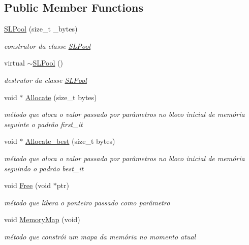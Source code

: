 \subsection*{Public Member Functions}
\begin{DoxyCompactItemize}
\item 
\hyperlink{class_s_l_pool_aea29c4db7975b53f06c4fad1b5901cec}{S\+L\+Pool} (size\+\_\+t \+\_\+bytes)
\begin{DoxyCompactList}\small\item\em construtor da classe \hyperlink{class_s_l_pool}{S\+L\+Pool} \end{DoxyCompactList}\item 
virtual \hyperlink{class_s_l_pool_aec8dd0c2fe10addb1786447f8ed62c20}{$\sim$\+S\+L\+Pool} ()
\begin{DoxyCompactList}\small\item\em destrutor da classe \hyperlink{class_s_l_pool}{S\+L\+Pool} \end{DoxyCompactList}\item 
void $\ast$ \hyperlink{class_s_l_pool_a3bb05b3941f7e04113873ee57b8f3372}{Allocate} (size\+\_\+t bytes)
\begin{DoxyCompactList}\small\item\em método que aloca o valor passado por parâmetros no bloco inicial de memória seguinte o padrão first\+\_\+it \end{DoxyCompactList}\item 
void $\ast$ \hyperlink{class_s_l_pool_a67edac73b37d0252301591f73f3d4ecb}{Allocate\+\_\+best} (size\+\_\+t bytes)
\begin{DoxyCompactList}\small\item\em método que aloca o valor passado por parâmetros no bloco inicial de memória seguindo o padrão best\+\_\+it \end{DoxyCompactList}\item 
void \hyperlink{class_s_l_pool_aaa30890e07db032bf4834f832d4c5ac8}{Free} (void $\ast$ptr)
\begin{DoxyCompactList}\small\item\em método que libera o ponteiro passado como parâmetro \end{DoxyCompactList}\item 
void \hyperlink{class_s_l_pool_aafeaf06af67e80854ffbd9e9b5ad5f63}{Memory\+Map} (void)
\begin{DoxyCompactList}\small\item\em método que constrói um mapa da memória no momento atual \end{DoxyCompactList}\end{DoxyCompactItemize}


